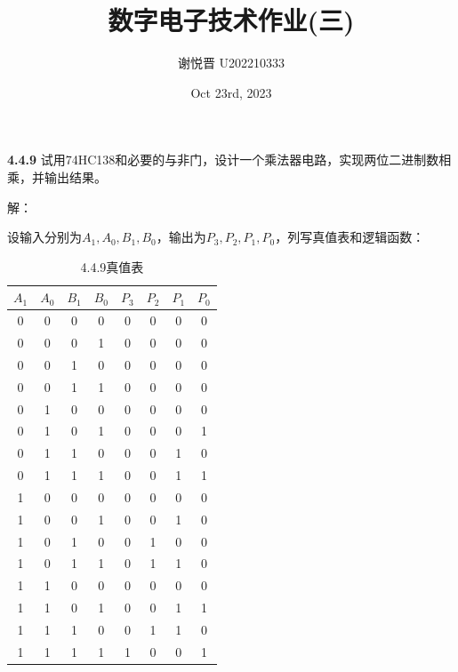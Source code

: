 \documentclass[a4paper,11pt,UTF8]{article}
\title{数字电子技术作业(三)}
\author{谢悦晋 \quad U202210333}
\date{Oct 23rd, 2023 }
\begin{document}
\maketitle
\textbf{4.4.9} 试用74HC138和必要的与非门，设计一个乘法器电路，实现两位二进制数相乘，并输出结果。

解：

设输入分别为$A_1,A_0,B_1,B_0$，输出为$P_3,P_2,P_1,P_0$，列写真值表和逻辑函数：

\begin{table}[h]
	\centering
	\caption*{4.4.9真值表}
	
	\begin{tabular}{cccc|cccc}
		\hline
		$A_1$ & $A_0$ & $B_1$ & $B_0$ & $P_3$ & $P_2$ & $P_1$ & $P_0$\\
		\hline
		0 & 0 & 0 & 0 & 0 & 0 & 0 & 0\\
		0 & 0 & 0 & 1 & 0 & 0 & 0 & 0\\
		0 & 0 & 1 & 0 & 0 & 0 & 0 & 0\\
		0 & 0 & 1 & 1 & 0 & 0 & 0 & 0\\
		0 & 1 & 0 & 0 & 0 & 0 & 0 & 0\\
		0 & 1 & 0 & 1 & 0 & 0 & 0 & 1\\
		0 & 1 & 1 & 0 & 0 & 0 & 1 & 0\\
		0 & 1 & 1 & 1 & 0 & 0 & 1 & 1\\
		1 & 0 & 0 & 0 & 0 & 0 & 0 & 0\\
		1 & 0 & 0 & 1 & 0 & 0 & 1 & 0\\
		1 & 0 & 1 & 0 & 0 & 1 & 0 & 0\\
		1 & 0 & 1 & 1 & 0 & 1 & 1 & 0\\
		1 & 1 & 0 & 0 & 0 & 0 & 0 & 0\\
		1 & 1 & 0 & 1 & 0 & 0 & 1 & 1\\
		1 & 1 & 1 & 0 & 0 & 1 & 1 & 0\\
		1 & 1 & 1 & 1 & 1 & 0 & 0 & 1\\
		\hline
	\end{tabular}
	\label{table_MAP}
\end{table}
\end{document}
